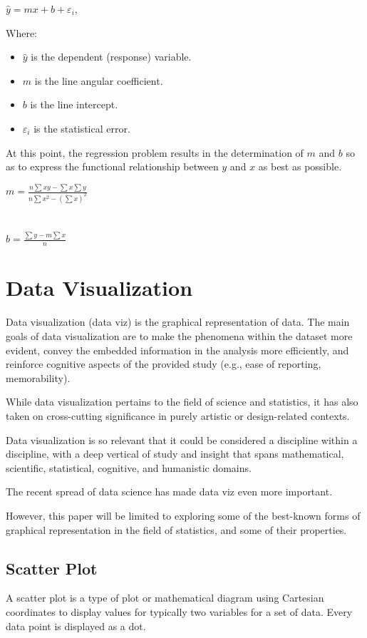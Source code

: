 \documentclass{article}
\begin{document}
$\hat{y} = mx + b +\varepsilon_{i}$,

Where:
\begin{itemize}
    \item $\hat{y}$ is the dependent (response) variable.
    \item $m$ is the line angular coefficient.
    \item $b$ is the line intercept.
    \item $\varepsilon_{i}$ is the statistical error.
\end{itemize}

At this point, the regression problem results in the determination of $m$ and $b$ so as to express the functional relationship between $y$ and $x$ as best as possible.

$\displaystyle m = \frac{n \sum{xy} - \sum{x}\sum{y}}{n\sum{x^2} - (\sum{x})^2}$ \\ \mbox{} \\
\mbox{} \\
$\displaystyle b = \frac{\sum{y} - m\sum{x}}{n}$

\clearpage
\section{Data Visualization}
Data visualization (data viz) is the graphical representation of data. 
The main goals of data visualization are to make the phenomena within the dataset more evident, convey the embedded information in the analysis more efficiently, and reinforce cognitive aspects of the provided study (e.g., ease of reporting, memorability).

While data visualization pertains to the field of science and statistics, it has also taken on cross-cutting significance in purely artistic or design-related contexts.

Data visualization  is so relevant that it could be considered a discipline within a discipline, with a deep vertical of study and insight that spans mathematical, scientific, statistical, cognitive, and humanistic domains. 

The recent spread of data science has made data viz even more important.

However, this paper will be limited to exploring some of the best-known forms of graphical representation in the field of statistics, and some of their properties.

\subsection{Scatter Plot}
A scatter plot is a type of plot or mathematical diagram using Cartesian coordinates to display values for typically two variables for a set of data. Every data point is displayed as a dot.
\end{document}
